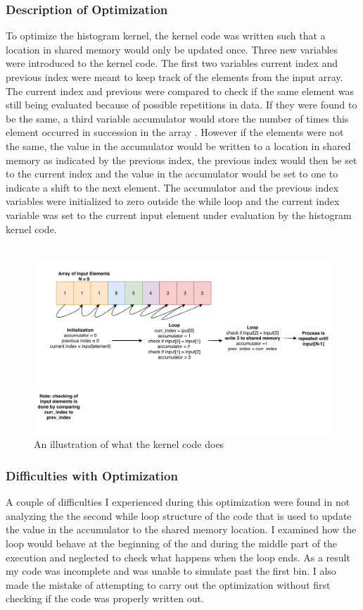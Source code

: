 \documentclass{article}
\begin{document}
\subsubsection{Description of Optimization}
To optimize the histogram kernel, the kernel code was written such that a location in shared memory would only be updated once. Three new variables were introduced to the kernel code. The first two variables current index and previous index were meant to keep track of the elements from the input array. The current index and previous were compared to check if the same element was still being evaluated because of possible repetitions in data. If they were found to be the same, a third variable accumulator would store the number of times this element occurred in succession in the array . However if the elements were not the same, the value in the accumulator would be written to a location in shared memory as indicated by the previous index, the previous index would then be set to the current index and the value in the accumulator would be set to one to indicate a shift to the next element. The accumulator and the previous index variables were initialized to zero outside the while loop and the current index variable was set to the current input element under evaluation by the histogram kernel code. 
\\
\\
\begin{figure}[h]
\includegraphics[width=\textwidth]{Illustration_Diagram.png}
\caption{An illustration of what the kernel code does}
\center
\end{figure}

\subsubsection{Difficulties with Optimization}
A couple of difficulties I experienced during this optimization were found in not analyzing the the second while loop structure of the code that is used to update the value in the accumulator to the shared memory location. I examined how the loop would behave at the beginning of the and during the middle part of the execution and neglected to check what happens when the loop ends. As a result my code was incomplete and was unable to simulate past the first bin. I also made the mistake of attempting to carry out the optimization without first checking if the code was properly written out. 
\end{document}
